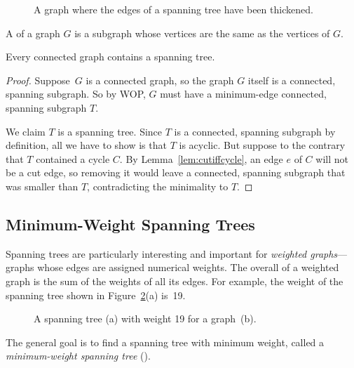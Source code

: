 \begin{figure}
\caption{A graph where the edges of a spanning tree have been
  thickened.}
\label{fig:5LL}
\end{figure}

\begin{definition}
A  of a graph $G$ is a subgraph whose vertices
are the same as the vertices of $G$.
\end{definition}

\begin{theorem}\label{th:spantree}
Every connected graph contains a spanning tree.
\end{theorem}

\begin{proof}
Suppose~$G$ is a connected graph, so the graph $G$ itself is a
connected, spanning subgraph.  So by WOP, $G$ must have a minimum-edge
connected, spanning subgraph $T$.

We claim $T$ is a spanning tree.  Since $T$ is a connected, spanning
subgraph by definition, all we have to show is that $T$ is acyclic.
But suppose to the contrary that $T$ contained a cycle $C$.  By
Lemma~\ref{lem:cutiffcycle}, an edge $e$ of $C$ will not be a cut
edge, so removing it would leave a connected, spanning subgraph that
was smaller than $T$, contradicting the minimality to $T$.
\end{proof}

\subsection{Minimum-Weight Spanning Trees}\label{MST_subsec}

Spanning trees are particularly interesting and important for
\emph{weighted graphs}---graphs whose edges are assigned numerical
weights.  The overall  of a weighted graph is the sum of
the weights of all its edges.  For example, the weight of the spanning
tree shown in Figure~\ref{fig:5KA}(a) is~19.
\begin{figure}
\qquad
{}

\caption{A spanning tree (a) with weight 19 for a graph~(b).}
\label{fig:5KA}
\end{figure}

The general goal is to find a spanning tree with minimum weight,
called a \emph{minimum-weight spanning tree}
\textup(\textup).

\iffalse
\begin{definition}
A \term{minimum-weight spanning tree} (\textup\term{MST}\textup) of
an edge-weighted graph~$G$ is a spanning tree of~$G$ with the
smallest possible sum of edge weights.
\end{definition}
\fi

